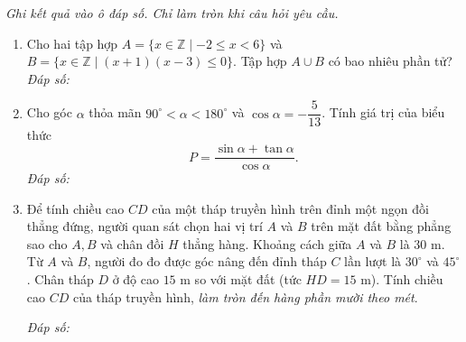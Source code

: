 \documentclass[12pt,a4paper]{article}
\newcommand{\parttitle}[1]{\par\vspace{3pt}{\large\bfseries\color{ink}#1}\par\vspace{2pt}}
\newcommand{\answerbox}{\hfill\textit{Đáp số:}\ \fbox{\rule{0pt}{13pt}\hspace{2.2cm}}}
\begin{document}
\vspace{7pt}
\parttitle{PHẦN III. Trả lời ngắn}
\textit{Ghi kết quả vào ô đáp số. Chỉ làm tròn khi câu hỏi yêu cầu.}
\begin{enumerate}
\item Cho hai tập hợp $A = \{x \in \mathbb{Z} \mid -2 \leq x < 6\}$ và $B = \{x \in \mathbb{Z} \mid (x + 1)(x - 3) \leq 0\}$. Tập hợp $A \cup B$ có bao nhiêu phần tử?
\answerbox
\item Cho góc $\alpha$ thỏa mãn $90^\circ < \alpha < 180^\circ$ và $\cos\alpha = -\dfrac{5}{13}$. Tính giá trị của biểu thức
\[
P = \frac{\sin\alpha + \tan\alpha}{\cos\alpha}.
\]
\answerbox
\item \begin{minipage}[t]{0.48\linewidth}
Để tính chiều cao $CD$ của một tháp truyền hình trên đỉnh một ngọn đồi thẳng đứng, người quan sát chọn hai vị trí $A$ và $B$ trên mặt đất bằng phẳng sao cho $A, B$ và chân đồi $H$ thẳng hàng. Khoảng cách giữa $A$ và $B$ là $30\text{ m}$. Từ $A$ và $B$, người đo đo được góc nâng đến đỉnh tháp $C$ lần lượt là $30^\circ$ và $45^\circ$. Chân tháp $D$ ở độ cao $15\text{ m}$ so với mặt đất (tức $HD = 15\text{ m}$). Tính chiều cao $CD$ của tháp truyền hình, \textit{làm tròn đến hàng phần mười theo mét}.
\par\vspace{4pt}\answerbox
\end{minipage}\hfill%
\begin{minipage}[t]{0.50\linewidth}
\vspace{-0.4\baselineskip}
\centering
{}
\end{minipage}
\end{enumerate}
\end{document}
